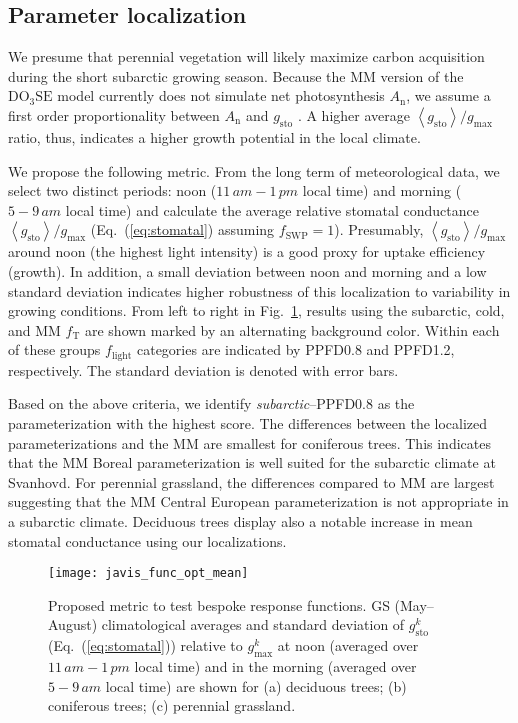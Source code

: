 \documentclass[bg, manuscript]{copernicus}
\begin{document}
\subsection{Parameter localization}
\label{subsec:res_local}

We presume that perennial vegetation will likely maximize carbon acquisition during the short subarctic growing season. Because the MM version of the $\mathrm{DO_3SE}$ model currently does not simulate net photosynthesis $A_\mathrm{n}$, we assume a first order proportionality between $A_\mathrm{n}$ and $g_\mathrm{sto}$ \citep{GCB:Medlyn2011}. A higher average $\left<g_\mathrm{sto}\right>/g_\mathrm{max}$ ratio, thus, indicates a higher growth potential in the local climate.

We propose the following metric. From the long term of meteorological data, we select two distinct periods: noon ($11\,\unit{am}-1\,\unit{pm}$ local time) and morning ($5-9\,\unit{am}$ local time) and calculate the average relative stomatal conductance $\left<g_\mathrm{sto}\right>/g_\mathrm{max}$ (Eq.~(\ref{eq:stomatal}) assuming $f_\mathrm{SWP}=1$). Presumably, $\left<g_\mathrm{sto}\right>/g_\mathrm{max}$ around noon (the highest light intensity) is a good proxy for  uptake efficiency (growth). In addition, a small deviation between noon and morning and a low standard deviation indicates higher robustness of this localization to variability in growing conditions. From left to right in Fig.~\ref{fig:javis_func_opt_mean}, results using the subarctic, cold, and MM $f_\mathrm{T}$ are shown marked by an alternating background color. Within each of these groups $f_\mathrm{light}$ categories are indicated by PPFD0.8 and PPFD1.2, respectively. The standard deviation is denoted with error bars. 

Based on the above criteria, we identify \emph{subarctic}--PPFD0.8 as the parameterization with the highest score. The differences between the localized parameterizations and the MM are smallest for coniferous trees. This indicates that the MM Boreal parameterization is well suited for the subarctic climate at Svanhovd. For perennial grassland, the differences compared to MM are largest suggesting that the MM Central European parameterization is not appropriate in a subarctic climate. Deciduous trees display also a notable increase in mean stomatal conductance using our localizations.

\begin{figure}[t]
  \texttt{[image: javis\_func\_opt\_mean]}
  \caption{Proposed metric to test bespoke response functions. GS (May--August) climatological averages and standard deviation of $g_\mathrm{sto}^k$ (Eq.~(\ref{eq:stomatal})) relative to $g_\mathrm{max}^k$ at noon (averaged over $11\,\unit{am}-1\,\unit{pm}$ local time) and in the morning (averaged over $5-9\,\unit{am}$ local time) are shown for (a) deciduous trees; (b) coniferous trees; (c) perennial grassland.}
  \label{fig:javis_func_opt_mean}
\end{figure}
\end{document}
